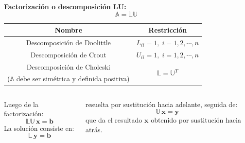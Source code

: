 \documentclass[9pt, aspectratio=169]{beamer}
\begin{document}
\begin{frame}
	\textbf{Factorización o descomposición LU:}
	\begin{equation*}
		\mathbb{A} = \mathbb{L U}
	\end{equation*}

	\begin{center}
		\begin{tabular}{c c}
			\toprule
			\textbf{Nombre}                                                & \textbf{Restricción}                         \\
			\midrule
			Descomposición de Doolittle                                    & $L_{ii} = 1, \; i = 1, 2, \cdots,n$          \\
			Descomposición de Crout                                        & $U_{ii} = 1, \; i = 1, 2, \cdots,n$          \\
			Descomposición de Choleski                                     & \multirow{2}{*}{$\mathbb{L} = \mathbb{U}^T$} \\
			{\small ($\mathbb{A}$ debe ser simétrica y definida positiva)} &                                              \\
			\bottomrule
		\end{tabular}
	\end{center}
	\vspace{2em}

	\begin{columns}[t]
		Luego de la factorización:
		\begin{equation*}
			\mathbb{LU} \, \bm{x} = \bm{b}
		\end{equation*}
		La solución consiste en:
		\begin{equation*}
			\mathbb{L} \, \bm{y} = \bm{b}
		\end{equation*}

		resuelta por sustitución hacia adelante, seguida de:
		\begin{equation*}
			\mathbb{U} \, \bm{x} = \bm{y}
		\end{equation*}
		que da el resultado $\bm{x}$ obtenido por sustitución hacia atrás.
	\end{columns}
\end{frame}
\end{document}
